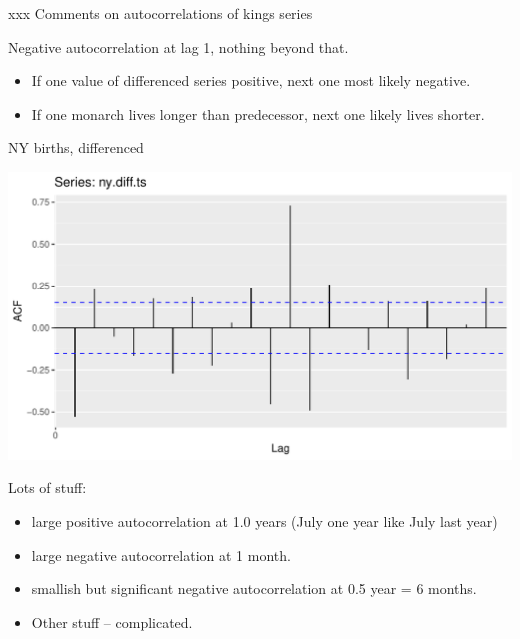 \documentclass[ignorenonframetext,]{beamer}
\newenvironment{Shaded}{\begin{snugshade}}{\end{snugshade}}
\newcommand{\DataTypeTok}[1]{\textcolor[rgb]{0.13,0.29,0.53}{#1}}
\newcommand{\KeywordTok}[1]{\textcolor[rgb]{0.13,0.29,0.53}{\textbf{#1}}}
\newcommand{\NormalTok}[1]{#1}
\newcommand{\OperatorTok}[1]{\textcolor[rgb]{0.81,0.36,0.00}{\textbf{#1}}}
\newcommand{\StringTok}[1]{\textcolor[rgb]{0.31,0.60,0.02}{#1}}
\providecommand{\tightlist}{%
  \setlength{\itemsep}{0pt}\setlength{\parskip}{0pt}}
\begin{document}
\begin{frame}{xxx Comments on autocorrelations of kings series}
\protect\hypertarget{xxx-comments-on-autocorrelations-of-kings-series}{}

Negative autocorrelation at lag 1, nothing beyond that.

\begin{itemize}
\tightlist
\item
  If one value of differenced series positive, next one most likely
  negative.
\item
  If one monarch lives longer than predecessor, next one likely lives
  shorter.
\end{itemize}

\end{frame}

\begin{frame}[fragile]{NY births, differenced}
\protect\hypertarget{ny-births-differenced}{}

\begin{Shaded}
\end{Shaded}

\includegraphics{figure/unnamed-chunk-32-1.pdf}

\end{frame}

\begin{frame}{Lots of stuff:}
\protect\hypertarget{lots-of-stuff}{}

\begin{itemize}
\tightlist
\item
  large positive autocorrelation at 1.0 years (July one year like July
  last year)
\item
  large negative autocorrelation at 1 month.
\item
  smallish but significant negative autocorrelation at 0.5 year = 6
  months.
\item
  Other stuff -- complicated.
\end{itemize}

\end{frame}
\end{document}
